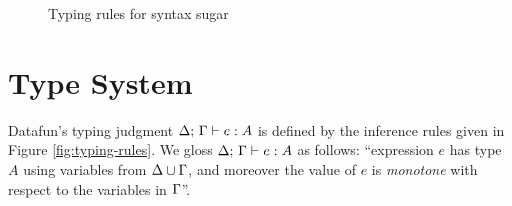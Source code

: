 \begin{figure}

  \caption{Typing rules for syntax sugar}
  \label{fig:pattern-typing}
\end{figure}


\section{Type System}
\label{sec:typing-rules}

Datafun's typing judgment ${\Delta};\,{\Gamma}\vdash {e}:{A}$ is defined by the inference rules
given in Figure \ref{fig:typing-rules}. We gloss ${\Delta};\,{\Gamma}\vdash {e}:{A}$ as
follows: ``expression $e$ has type $A$ using variables from $\Delta \cup \Gamma$, and
moreover the value of $e$ is \emph{monotone} with respect to the variables in
$\Gamma$''.

